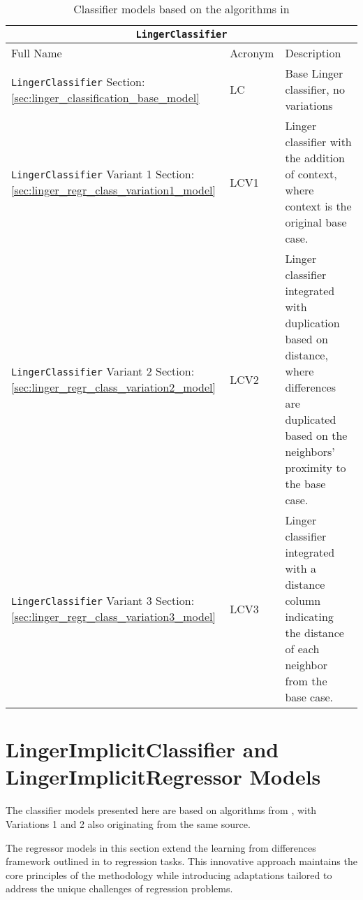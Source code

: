 \documentclass[a4paper, 12pt]{report}
\begin{document}
\begin{table}[H]
    \centering
    \begin{tabular}{ |p{6cm}|p{2cm}|p{9cm}| }
        \hline
        \multicolumn{3}{|c|}{\texttt{LingerClassifier}} \\
        \hline
        \hline
        Full Name & Acronym & Description \\
        \hline
        \texttt{LingerClassifier}  Section: \ref{sec:linger_classification_base_model} & LC & Base Linger classifier, no variations \\
        \hline
        \texttt{LingerClassifier} Variant 1 Section: \ref{sec:linger_regr_class_variation1_model} & LCV1 & Linger classifier with the addition of context, where context is the original base case. \\
        \hline
        \texttt{LingerClassifier} Variant 2 Section: \ref{sec:linger_regr_class_variation2_model} & LCV2 & Linger classifier integrated with duplication based on distance, where differences are duplicated based on the neighbors' proximity to the base case. \\
        \hline
        \texttt{LingerClassifier} Variant 3 Section: \ref{sec:linger_regr_class_variation3_model} & LCV3 & Linger classifier integrated with a distance column indicating the distance of each neighbor from the base case. \\
        \hline
    \end{tabular}
    \caption{Classifier models based on the algorithms in \cite{learningFromDifferences2022}}
    \label{tab:LingerClassifier_models}
\end{table}

\section*{LingerImplicitClassifier and LingerImplicitRegressor Models}
The classifier models presented here are based on algorithms from \cite{ye2021learning}, with Variations 1 and 2 also originating from the same source.

The regressor models in this section extend the learning from differences framework outlined in \cite{ye2021learning} to regression tasks. 
This innovative approach maintains the core principles of the methodology while introducing adaptations tailored to address the unique challenges of regression problems.
\end{document}
